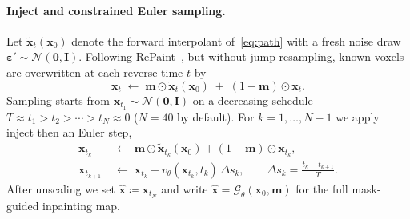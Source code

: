 \documentclass[twoside]{article}
\begin{document}
\paragraph{Inject and constrained Euler sampling.}
Let \(\tilde{\mathbf{x}}_t(\mathbf{x}_0)\) denote the forward interpolant
of~\eqref{eq:path} with a fresh noise draw
\(\boldsymbol{\varepsilon}'\sim\mathcal{N}(\mathbf{0},\mathbf{I})\).
Following RePaint~\cite{lugmayr2022repaint}, but without jump resampling,
known voxels are overwritten at each reverse time \(t\) by
\begin{equation}
\label{eq:inject}
\mathbf{x}_t
\;\leftarrow\;
\mathbf{m}\odot\tilde{\mathbf{x}}_t(\mathbf{x}_0)
\;+\;
(1-\mathbf{m})\odot\mathbf{x}_t.
\end{equation}
Sampling starts from \(\mathbf{x}_{t_1}\sim\mathcal{N}(\mathbf{0},\mathbf{I})\)
on a decreasing schedule
\(T\approx t_1>t_2>\cdots>t_N\approx 0\)
(\(N{=}40\) by default). For \(k=1,\dots,N-1\) we apply inject
then an Euler step,
\begin{equation}
\label{eq:sampler}
\begin{aligned}
\mathbf{x}_{t_k}
&\;\leftarrow\;
\mathbf{m}\odot\tilde{\mathbf{x}}_{t_k}(\mathbf{x}_0)
+(1-\mathbf{m})\odot\mathbf{x}_{t_k},\\
\mathbf{x}_{t_{k+1}}
&\;\leftarrow\;
\mathbf{x}_{t_k}
+
v_\theta(\mathbf{x}_{t_k},t_k)\,\Delta s_k,
\qquad
\Delta s_k=\tfrac{t_k-t_{k+1}}{T}.
\end{aligned}
\end{equation}
After unscaling we set \(\hat{\mathbf{x}}\coloneqq\mathbf{x}_{t_N}\) and write
\(\hat{\mathbf{x}}=\mathcal{G}_\theta(\mathbf{x}_0,\mathbf{m})\) for the full
mask-guided inpainting map.
\end{document}
